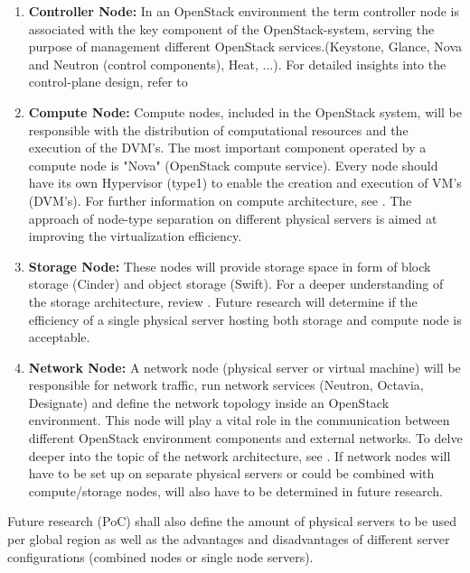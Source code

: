 \documentclass[]{article}
\begin{document}
\begin{enumerate}[label=\textbullet]
	\item\textbf{Controller Node:}
	In an OpenStack environment the term controller node is associated with the key component of the OpenStack-system, serving the purpose of management different OpenStack services.(Keystone, Glance, Nova and Neutron (control components), Heat, ...). 
	For detailed insights into the control-plane design, refer to \cite{OpenStackDoc-control}
			
	\item\textbf{Compute Node:}
	Compute nodes, included in the OpenStack system, will be responsible with the distribution of computational resources and the execution of the DVM's. 
	The most important component operated by a compute node is "Nova" (OpenStack compute service).
	Every node should have its own Hypervisor (type1) to enable the creation and execution of VM's (DVM's). 
	For further information on compute architecture, see \cite{OpenStackDoc-compute}. 
	The approach of node-type separation on different physical servers is aimed at improving the virtualization efficiency.

    \item\textbf{Storage Node:}
    These nodes will provide storage space in form of block storage (Cinder) and object storage (Swift). 
    For a deeper understanding of the storage architecture, review \cite{OpenStackDoc-storage}.
    Future research will determine if the efficiency of a single physical server hosting both storage and compute node is acceptable. 
  
	\item\textbf{Network Node:}
	A network node (physical server or virtual machine) will be responsible for network traffic, run network services (Neutron, Octavia, Designate) and define the network topology inside an OpenStack environment. 
	This node will play a vital role in the communication between different OpenStack environment components and external networks. 
	To delve deeper into the topic of the network architecture, see \cite{OpenStackDoc-network}. 
	If network nodes will have to be set up on separate physical servers or could be combined with compute/storage nodes, will also have to be determined in future research. 
\end{enumerate}

Future research (PoC) shall also define the amount of physical servers to be used per global region as well as the advantages and disadvantages of different server configurations (combined nodes or single node servers).
\newline
\end{document}
